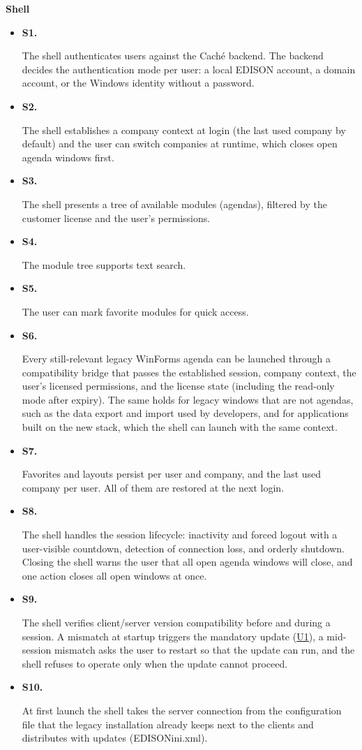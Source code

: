 \documentclass{article}
\newcommand{\reqdef}[1]{\hypertarget{req:#1}{\textbf{#1.}}}
\newcommand{\req}[1]{\hyperlink{req:#1}{#1}}
\begin{document}
\medskip
\noindent \textbf{Shell}
\begin{itemize}
  \item \reqdef{S1} The shell authenticates users against the Caché backend. The backend decides the authentication mode per user: a local EDISON account, a domain account, or the Windows identity without a password.
  \item \reqdef{S2} The shell establishes a company context at login (the last used company by default) and the user can switch companies at runtime, which closes open agenda windows first.
  \item \reqdef{S3} The shell presents a tree of available modules (agendas), filtered by the customer license and the user's permissions.
  \item \reqdef{S4} The module tree supports text search.
  \item \reqdef{S5} The user can mark favorite modules for quick access.
  \item \reqdef{S6} Every still-relevant legacy WinForms agenda can be launched through a compatibility bridge that passes the established session, company context, the user's licensed permissions, and the license state (including the read-only mode after expiry). The same holds for legacy windows that are not agendas, such as the data export and import used by developers, and for applications built on the new stack, which the shell can launch with the same context.
  \item \reqdef{S7} Favorites and layouts persist per user and company, and the last used company per user. All of them are restored at the next login.
  \item \reqdef{S8} The shell handles the session lifecycle: inactivity and forced logout with a user-visible countdown, detection of connection loss, and orderly shutdown. Closing the shell warns the user that all open agenda windows will close, and one action closes all open windows at once.
  \item \reqdef{S9} The shell verifies client/server version compatibility before and during a session. A mismatch at startup triggers the mandatory update (\req{U1}), a mid-session mismatch asks the user to restart so that the update can run, and the shell refuses to operate only when the update cannot proceed.
  \item \reqdef{S10} At first launch the shell takes the server connection from the configuration file that the legacy installation already keeps next to the clients and distributes with updates (EDISONini.xml).

\end{itemize}
\end{document}
